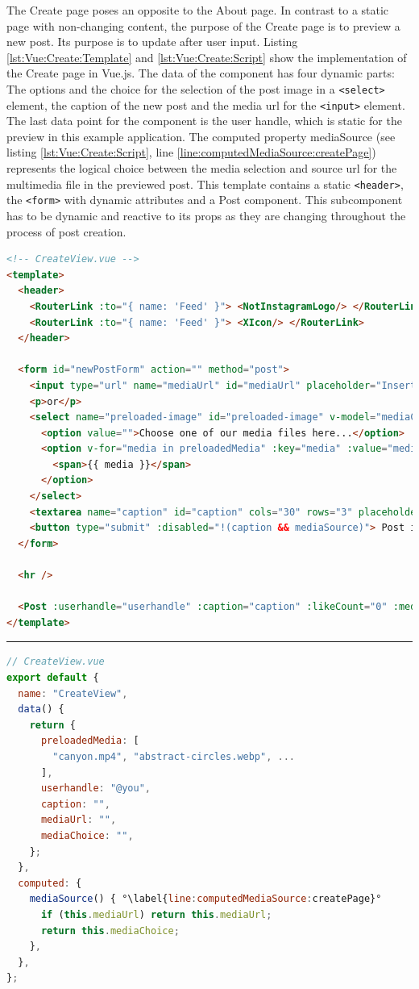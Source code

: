 \documentclass[a4paper, 12pt]{article}
\begin{document}
The Create page poses an opposite to the About page.
In contrast to a static page with non-changing content, the purpose of the Create page is to preview a new post.
Its purpose is to update after user input.
Listing \ref{lst:Vue:Create:Template} and \ref{lst:Vue:Create:Script} show the implementation of the Create page in Vue.js.
The data of the component has four dynamic parts: The options and the choice for the selection of the post image in a \verb|<select>| element, the caption of the new post and the media \acrshort{url} for the \verb|<input>| element.
The last data point for the component is the user handle, which is static for the preview in this example application.
The computed property mediaSource (see listing \ref{lst:Vue:Create:Script}, line \ref{line:computedMediaSource:createPage}) represents the logical choice between the media selection and source \acrshort{url} for the multimedia file in the previewed post.
This template contains a static \verb|<header>|, the \verb|<form>| with dynamic attributes and a Post component.
This subcomponent has to be dynamic and reactive to its props as they are changing throughout the process of post creation.

\vspace{1cm}
\begin{lstlisting}[caption=Create page in Vue.js (Template), label={lst:Vue:Create:Template}, language=HTML]
<!-- CreateView.vue -->
<template>
  <header>
    <RouterLink :to="{ name: 'Feed' }"> <NotInstagramLogo/> </RouterLink>
    <RouterLink :to="{ name: 'Feed' }"> <XIcon/> </RouterLink>
  </header>

  <form id="newPostForm" action="" method="post">
    <input type="url" name="mediaUrl" id="mediaUrl" placeholder="Insert your media URL here..." v-model="mediaUrl" />
    <p>or</p>
    <select name="preloaded-image" id="preloaded-image" v-model="mediaChoice">
      <option value="">Choose one of our media files here...</option>
      <option v-for="media in preloadedMedia" :key="media" :value="media">
        <span>{{ media }}</span>
      </option>
    </select>
    <textarea name="caption" id="caption" cols="30" rows="3" placeholder="Type your caption here" v-model="caption"/>
    <button type="submit" :disabled="!(caption && mediaSource)"> Post it! </button>
  </form>

  <hr />

  <Post :userhandle="userhandle" :caption="caption" :likeCount="0" :mediaSource="mediaSource" :hideActionIcons="true" />
</template>
\end{lstlisting}
\hrule
\begin{lstlisting}[caption=Create page in Vue.js (Script), label={lst:Vue:Create:Script}, language=JavaScript, firstnumber=25, escapechar=°]
// CreateView.vue
export default {
  name: "CreateView",
  data() {
    return {
      preloadedMedia: [
        "canyon.mp4", "abstract-circles.webp", ...
      ],
      userhandle: "@you",
      caption: "",
      mediaUrl: "",
      mediaChoice: "",
    };
  },
  computed: {
    mediaSource() { °\label{line:computedMediaSource:createPage}°
      if (this.mediaUrl) return this.mediaUrl;
      return this.mediaChoice;
    },
  },
};
\end{lstlisting}
\vspace{1cm}
\end{document}

